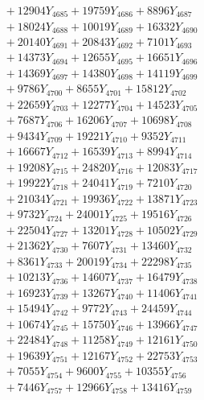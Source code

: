 \documentclass[a4paper,10pt]{article}
\begin{document}
{\begin{align}
&\;  + 12904 Y_{4685} + 19759 Y_{4686} + 8896 Y_{4687} \\[0.3ex]
&\;  + 18024 Y_{4688} + 10019 Y_{4689} + 16332 Y_{4690} \\[0.3ex]
&\;  + 20140 Y_{4691} + 20843 Y_{4692} + 7101 Y_{4693} \\[0.3ex]
&\;  + 14373 Y_{4694} + 12655 Y_{4695} + 16651 Y_{4696} \\[0.3ex]
&\;  + 14369 Y_{4697} + 14380 Y_{4698} + 14119 Y_{4699} \\[0.3ex]
&\;  + 9786 Y_{4700} + 8655 Y_{4701} + 15812 Y_{4702} \\[0.3ex]
&\;  + 22659 Y_{4703} + 12277 Y_{4704} + 14523 Y_{4705} \\[0.3ex]
&\;  + 7687 Y_{4706} + 16206 Y_{4707} + 10698 Y_{4708} \\[0.5ex]\allowbreak
&\;  + 9434 Y_{4709} + 19221 Y_{4710} + 9352 Y_{4711} \\[0.3ex]
&\;  + 16667 Y_{4712} + 16539 Y_{4713} + 8994 Y_{4714} \\[0.3ex]
&\;  + 19208 Y_{4715} + 24820 Y_{4716} + 12083 Y_{4717} \\[0.3ex]
&\;  + 19922 Y_{4718} + 24041 Y_{4719} + 7210 Y_{4720} \\[0.3ex]
&\;  + 21034 Y_{4721} + 19936 Y_{4722} + 13871 Y_{4723} \\[0.3ex]
&\;  + 9732 Y_{4724} + 24001 Y_{4725} + 19516 Y_{4726} \\[0.3ex]
&\;  + 22504 Y_{4727} + 13201 Y_{4728} + 10502 Y_{4729} \\[0.3ex]
&\;  + 21362 Y_{4730} + 7607 Y_{4731} + 13460 Y_{4732} \\[0.3ex]
&\;  + 8361 Y_{4733} + 20019 Y_{4734} + 22298 Y_{4735} \\[0.3ex]
&\;  + 10213 Y_{4736} + 14607 Y_{4737} + 16479 Y_{4738} \\[0.5ex]\allowbreak
&\;  + 16923 Y_{4739} + 13267 Y_{4740} + 11406 Y_{4741} \\[0.3ex]
&\;  + 15494 Y_{4742} + 9772 Y_{4743} + 24459 Y_{4744} \\[0.3ex]
&\;  + 10674 Y_{4745} + 15750 Y_{4746} + 13966 Y_{4747} \\[0.3ex]
&\;  + 22484 Y_{4748} + 11258 Y_{4749} + 12161 Y_{4750} \\[0.3ex]
&\;  + 19639 Y_{4751} + 12167 Y_{4752} + 22753 Y_{4753} \\[0.3ex]
&\;  + 7055 Y_{4754} + 9600 Y_{4755} + 10355 Y_{4756} \\[0.3ex]
&\;  + 7446 Y_{4757} + 12966 Y_{4758} + 13416 Y_{4759} \\[0.3ex]

\end{align}}
\end{document}

